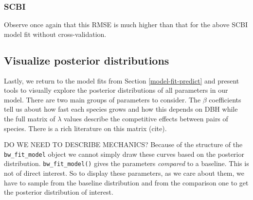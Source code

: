 \documentclass[12pt]{article}
\newenvironment{Shaded}{\begin{snugshade}}{\end{snugshade}}
\newcommand{\CommentTok}[1]{\textcolor[rgb]{0.56,0.35,0.01}{\textit{#1}}}
\newcommand{\DataTypeTok}[1]{\textcolor[rgb]{0.13,0.29,0.53}{#1}}
\newcommand{\KeywordTok}[1]{\textcolor[rgb]{0.13,0.29,0.53}{\textbf{#1}}}
\newcommand{\NormalTok}[1]{#1}
\newcommand{\OperatorTok}[1]{\textcolor[rgb]{0.81,0.36,0.00}{\textbf{#1}}}
\newcommand{\StringTok}[1]{\textcolor[rgb]{0.31,0.60,0.02}{#1}}
\begin{document}
\hypertarget{scbi-4}{%
\subsubsection{SCBI}\label{scbi-4}}

Observe once again that this RMSE is much higher than that for the above
SCBI model fit without cross-validation.

\begin{Shaded}
\end{Shaded}

\hypertarget{viz-posterior-distributions}{%
\subsection{Visualize posterior
distributions}\label{viz-posterior-distributions}}

Lastly, we return to the model fits from Section \ref{model-fit-predict}
and present tools to visually explore the posterior distributions of all
parameters in our model. There are two main groups of parameters to
consider. The \(\beta\) coefficients tell us about how fast each species
grows and how this depends on DBH while the full matrix of \(\lambda\)
values describe the competitive effects between pairs of species. There
is a rich literature on this matrix (cite).

DO WE NEED TO DESCRIBE MECHANICS? Because of the structure of the
\texttt{bw\_fit\_model} object we cannot simply draw these curves based
on the posterior distribution. \texttt{bw\_fit\_model()} gives the
parameters \emph{compared} to a baseline. This is not of direct
interest. So to display these parameters, as we care about them, we have
to sample from the baseline distribution and from the comparison one to
get the posterior distribution of interest.
\end{document}
